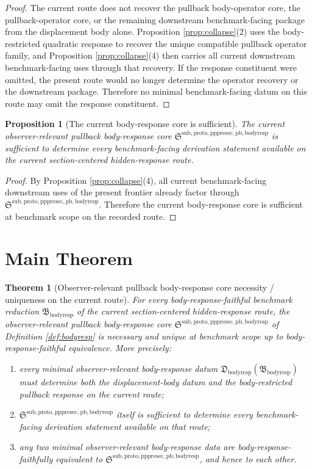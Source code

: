 \documentclass[11pt]{article}
\newcommand{\PullbackBodyResponseCore}{\mathfrak S^{\mathrm{sub,proto,pppresec,pb,bodyresp}}}
\newcommand{\BodyResponseReduction}{\mathfrak B_{\mathrm{bodyresp}}}
\newcommand{\BodyResponseDatum}{\mathfrak D_{\mathrm{bodyresp}}}
\newtheorem{proposition}{Proposition}
\newtheorem{theorem}{Theorem}
\begin{document}
\begin{proof}
The current route does not recover the pullback body-operator core, the pullback-operator core, or the remaining downstream benchmark-facing package from the displacement body alone. Proposition \ref{prop:collapse}(2) uses the body-restricted quadratic response to recover the unique compatible pullback operator family, and Proposition \ref{prop:collapse}(4) then carries all current downstream benchmark-facing uses through that recovery. If the response constituent were omitted, the present route would no longer determine the operator recovery or the downstream package. Therefore no minimal benchmark-facing datum on this route may omit the response constituent.
\end{proof}

\begin{proposition}[The current body-response core is sufficient]
\label{prop:sufficient}
The current observer-relevant pullback body-response core \(\PullbackBodyResponseCore\) is sufficient to determine every benchmark-facing derivation statement available on the current section-centered hidden-response route.
\end{proposition}

\begin{proof}
By Proposition \ref{prop:collapse}(4), all current benchmark-facing downstream uses of the present frontier already factor through \(\PullbackBodyResponseCore\). Therefore the current body-response core is sufficient at benchmark scope on the recorded route.
\end{proof}

\section{Main Theorem}

\begin{theorem}[Observer-relevant pullback body-response core necessity / uniqueness on the current route]
\label{thm:main}
For every body-response-faithful benchmark reduction \(\BodyResponseReduction\) of the current section-centered hidden-response route, the observer-relevant pullback body-response core \(\PullbackBodyResponseCore\) of Definition \ref{def:bodyresp} is necessary and unique at benchmark scope up to body-response-faithful equivalence. More precisely:
\begin{enumerate}
    \item every minimal observer-relevant body-response datum \(\BodyResponseDatum(\BodyResponseReduction)\) must determine both the displacement-body datum and the body-restricted pullback response on the current route;
    \item \(\PullbackBodyResponseCore\) itself is sufficient to determine every benchmark-facing derivation statement available on that route;
    \item any two minimal observer-relevant body-response data are body-response-faithfully equivalent to \(\PullbackBodyResponseCore\), and hence to each other.
\end{enumerate}
\end{theorem}
\end{document}
